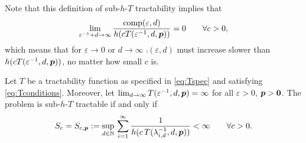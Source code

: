 \documentclass[11pt,a4paper]{article}
\begin{document}
Note that this definition of sub-$h$-$T$ tractability implies that
\begin{equation} \label{eq:comp_slow_hcT}
		\lim_{\varepsilon^{-1} + d \to \infty} \frac{\operatorname{comp}(\varepsilon,d)}{h(cT(\varepsilon^{-1},d,\boldsymbol{p}))} = 0 \qquad \forall c > 0,
\end{equation}
which means that for $\varepsilon \to 0$ or $d \to \infty$  $\comp(\varepsilon,d)$ must increase slower than $h(cT(\varepsilon^{-1},d,\boldsymbol{p}))$, no matter how small $c$ is.

\begin{theorem}\label{thm:subhT}
	Let $T$ be a tractability function as specified in \eqref{eq:Tspec} and satisfying \eqref{eq:Tconditions}.  Moreover, let $\lim_{d \to \infty} T(\varepsilon^{-1},d,\boldsymbol{p}) = \infty$ for all $\varepsilon > 0$, $\boldsymbol{p} > \boldsymbol{0}$.  The problem is sub-$h$-$T$ tractable if and only if
	\[
	S_c = S_{c,\boldsymbol{p}} :=\sup_{d\in\mathbb{N}}  \, \sum_{i=1}^\infty \frac1{h(c\, T(\lambda_{i,d}^{-1},d,\boldsymbol{p}))} <\infty \qquad \forall c > 0.
	\]
\end{theorem}
\end{document}
